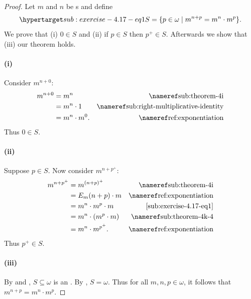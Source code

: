 \documentclass{report}
\begin{document}
\begin{proof}


  Let $m$ and $n$ be s and define
    \begin{equation}
      \hyperlabel{sub:exercise-4.17-eq1}
      S = \{p \in \omega \mid m^{n+p} = m^n \cdot m^p\}.
    \end{equation}
  We prove that (i) $0 \in S$ and (ii) if $p \in S$ then $p^+ \in S$.
  Afterwards we show that (iii) our theorem holds.

  \paragraph{(i)}%

    Consider $m^{n+0}$:
      \begin{align*}
        m^{n+0}
          & = m^n & \textref{sub:theorem-4i} \\
          & = m^n \cdot 1 & \textref{sub:right-multiplicative-identity} \\
          & = m^n \cdot m^0. & \textref{ref:exponentiation}
      \end{align*}
    Thus $0 \in S$.

  \paragraph{(ii)}%

    Suppose $p \in S$.
    Now consider $m^{n+p^+}$:
      \begin{align*}
        m^{n+p^+}
          & = m^{(n + p)^+} & \textref{sub:theorem-4i} \\
          & = E_m(n + p) \cdot m & \textref{ref:exponentiation} \\
          & = m^n \cdot m^p \cdot m & \eqref{sub:exercise-4.17-eq1} \\
          & = m^n \cdot (m^p \cdot m) & \textref{sub:theorem-4k-4} \\
          & = m^n \cdot m^{p^+}. & \textref{ref:exponentiation}
      \end{align*}
    Thus $p^+ \in S$.

  \paragraph{(iii)}%

    By  and ,
      $S \subseteq \omega$ is an .
    By , $S = \omega$.
    Thus for all $m, n, p \in \omega$, it follows that
      $m^{n+p} = m^n \cdot m^p$.

\end{proof}
\end{document}
